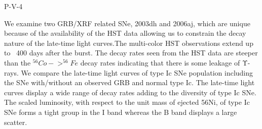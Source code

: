 P-V-4


\bigskip



\bigskip

\noindent We examine two GRB/XRF related SNe, 2003dh and 2006aj, which are unique because of the availability of the HST data allowing us to constrain the decay nature of the late-time light curves.The multi-color HST observations extend up to ~400 days after the burst. The decay rates seen from the HST data are steeper than the $^{56}Co->^{56}Fe$ decay rates indicating that there is some leakage of Υ-rays. We compare the late-time light curves of type Ic SNe population including the SNe with/without an observed GRB and normal type Ic. The late-time light curves display a wide range of decay rates adding to the diversity of type Ic SNe. The scaled luminosity, with respect to the unit mass of ejected 56Ni, of type Ic SNe forms a tight group in the I band whereas the B band displays a large scatter.

